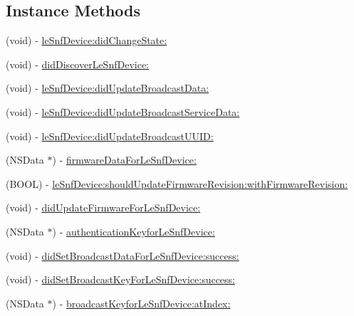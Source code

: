 \subsection*{Instance Methods}
\begin{DoxyCompactItemize}
\item 
(void) -\/ \hyperlink{protocol_le_snf_device_delegate-p_aecf4afb36045c3c55e730dca982d687d}{le\+Snf\+Device\+:did\+Change\+State\+:}
\item 
(void) -\/ \hyperlink{protocol_le_snf_device_delegate-p_a9d8d4cd99c2cb5700b9b98521f172f3c}{did\+Discover\+Le\+Snf\+Device\+:}
\item 
(void) -\/ \hyperlink{protocol_le_snf_device_delegate-p_ad97a9b524b0f444db1f13db19eee271e}{le\+Snf\+Device\+:did\+Update\+Broadcast\+Data\+:}
\item 
(void) -\/ \hyperlink{protocol_le_snf_device_delegate-p_af1fb2e5456683133331bae09cbae361f}{le\+Snf\+Device\+:did\+Update\+Broadcast\+Service\+Data\+:}
\item 
(void) -\/ \hyperlink{protocol_le_snf_device_delegate-p_a2e207092fb3cd82014b719ab62616a23}{le\+Snf\+Device\+:did\+Update\+Broadcast\+U\+U\+I\+D\+:}
\item 
(N\+S\+Data $\ast$) -\/ \hyperlink{protocol_le_snf_device_delegate-p_ae7edf1b8e6844189b03f2dd44eadc6b7}{firmware\+Data\+For\+Le\+Snf\+Device\+:}
\item 
(B\+O\+O\+L) -\/ \hyperlink{protocol_le_snf_device_delegate-p_a7ec8352747c971703ad69e77eefd6c31}{le\+Snf\+Device\+:should\+Update\+Firmware\+Revision\+:with\+Firmware\+Revision\+:}
\item 
(void) -\/ \hyperlink{protocol_le_snf_device_delegate-p_a07810701790417802c4bd356c9a39c63}{did\+Update\+Firmware\+For\+Le\+Snf\+Device\+:}
\item 
(N\+S\+Data $\ast$) -\/ \hyperlink{protocol_le_snf_device_delegate-p_a3f037b89e95522cb13151d1d659a0dc8}{authentication\+Keyfor\+Le\+Snf\+Device\+:}
\item 
(void) -\/ \hyperlink{protocol_le_snf_device_delegate-p_a732e014a13263ba967b6cbde771f2ed7}{did\+Set\+Broadcast\+Data\+For\+Le\+Snf\+Device\+:success\+:}
\item 
(void) -\/ \hyperlink{protocol_le_snf_device_delegate-p_aa79985328d69865fb3e3c2fc112c643a}{did\+Set\+Broadcast\+Key\+For\+Le\+Snf\+Device\+:success\+:}
\item 
(N\+S\+Data $\ast$) -\/ \hyperlink{protocol_le_snf_device_delegate-p_ad8542b8df3336e504b4855e02e246bfc}{broadcast\+Keyfor\+Le\+Snf\+Device\+:at\+Index\+:}
\item 

\end{DoxyCompactItemize}
